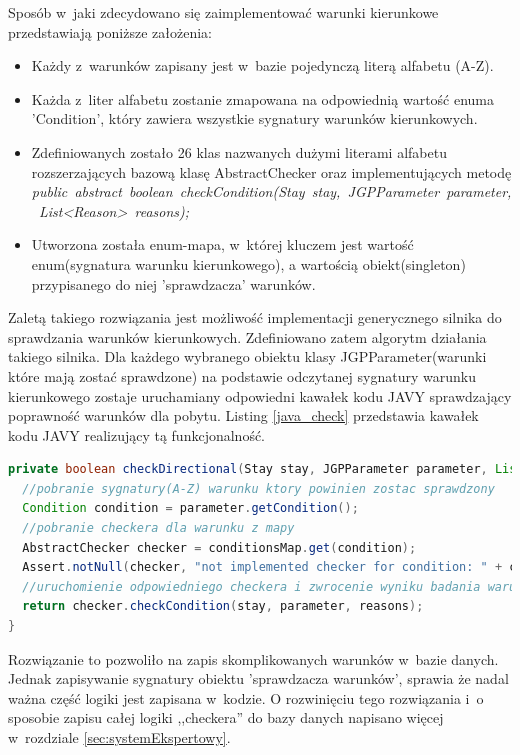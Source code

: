 Sposób w~jaki zdecydowano się zaimplementować warunki kierunkowe przedstawiają poniższe założenia:
\begin{itemize}
\item Każdy z~warunków zapisany jest w~bazie pojedynczą literą alfabetu (A-Z).
\item Każda z~liter alfabetu zostanie zmapowana na odpowiednią wartość enuma 'Condition', który zawiera wszystkie sygnatury warunków kierunkowych.
\item Zdefiniowanych zostało 26 klas nazwanych dużymi literami alfabetu rozszerzających bazową klasę AbstractChecker oraz implementujących metodę \mbox{\textit{public abstract boolean checkCondition(Stay stay, JGPParameter parameter, List<Reason> reasons);}}
\item Utworzona została enum-mapa, w~której kluczem jest wartość enum(sygnatura warunku kierunkowego), a wartością obiekt(singleton) przypisanego do niej 'sprawdzacza' warunków.
\end{itemize}
Zaletą takiego rozwiązania jest możliwość implementacji generycznego silnika do sprawdzania warunków kierunkowych. Zdefiniowano zatem algorytm działania takiego silnika. Dla każdego wybranego obiektu klasy \mbox{JGPParameter}(warunki które mają zostać sprawdzone) na podstawie odczytanej sygnatury warunku kierunkowego zostaje uruchamiany odpowiedni kawałek kodu JAVY sprawdzający poprawność warunków dla pobytu. Listing \ref{java_check} przedstawia kawałek kodu JAVY realizujący tą funkcjonalność.

\begin{lstlisting}[language=Java,caption={Metoda sprawdzająca warunki kierunkowe.},label=java_check]
private boolean checkDirectional(Stay stay, JGPParameter parameter, List<Reason> reasons) {
  //pobranie sygnatury(A-Z) warunku ktory powinien zostac sprawdzony
  Condition condition = parameter.getCondition();
  //pobranie checkera dla warunku z mapy
  AbstractChecker checker = conditionsMap.get(condition);
  Assert.notNull(checker, "not implemented checker for condition: " + condition);
  //uruchomienie odpowiedniego checkera i zwrocenie wyniku badania warunku
  return checker.checkCondition(stay, parameter, reasons);
}
\end{lstlisting}

Rozwiązanie to pozwoliło na zapis skomplikowanych warunków w~bazie danych. Jednak zapisywanie sygnatury obiektu 'sprawdzacza warunków', sprawia że nadal ważna część logiki jest zapisana w~kodzie. O rozwinięciu tego rozwiązania  i~o sposobie zapisu całej logiki ,,checkera'' do bazy danych napisano więcej w~rozdziale \ref{sec:systemEkspertowy}.

